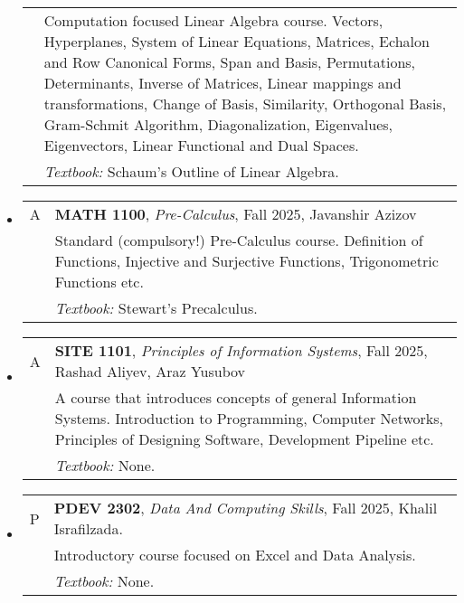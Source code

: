\documentclass[12pt]{article}
\begin{document}
\begin{itemize}[leftmargin = *]
\begin{tabularx}{\textwidth}{@{}lX@{}}
            \\
            & Computation focused Linear Algebra course. Vectors, Hyperplanes, System of Linear Equations, Matrices, Echalon and Row
            Canonical Forms, Span and Basis, Permutations, Determinants, Inverse of Matrices, Linear mappings and transformations, Change of Basis,
            Similarity, Orthogonal Basis, Gram-Schmit Algorithm, Diagonalization, Eigenvalues, Eigenvectors, Linear Functional and Dual Spaces.
            \\
            & \textit{Textbook:} Schaum's Outline of Linear Algebra.
        \end{tabularx}
    \item[]
        \begin{tabularx}{\textwidth}{@{}lX@{}}
            A & \textbf{MATH 1100}, \textit{Pre-Calculus}, Fall 2025, Javanshir Azizov
            \\
            & Standard (compulsory!) Pre-Calculus course. Definition of Functions, Injective and Surjective Functions, Trigonometric Functions etc.
            \\
            & \textit{Textbook:} Stewart's Precalculus.
        \end{tabularx}
    \item[]
        \begin{tabularx}{\textwidth}{@{}lX@{}}
            A & \textbf{SITE 1101}, \textit{Principles of Information Systems}, Fall 2025, Rashad Aliyev, Araz Yusubov
            \\
            & A course that introduces concepts of general Information Systems. Introduction to Programming, Computer Networks, Principles
            of Designing Software, Development Pipeline etc.
            \\
            & \textit{Textbook:} None.
        \end{tabularx}
    \item[]
        \begin{tabularx}{\textwidth}{@{}lX@{}}
            P & \textbf{PDEV 2302}, \textit{Data And Computing Skills}, Fall 2025, Khalil Israfilzada.

            \\
            & Introductory course focused on Excel and Data Analysis.
            \\
            & \textit{Textbook:} None.
        \end{tabularx}
\end{itemize}
\end{document}
